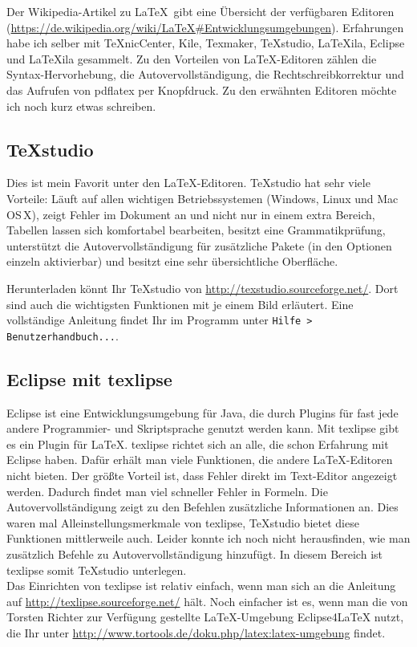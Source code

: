 Der Wikipedia-Artikel zu \LaTeX\ gibt eine Übersicht der verfügbaren Editoren (\url{https://de.wikipedia.org/wiki/LaTeX#Entwicklungsumgebungen}). Erfahrungen habe ich selber mit TeXnicCenter, Kile, Texmaker, TeXstudio, LaTeXila, Eclipse und LaTeXila gesammelt. Zu den Vorteilen von \LaTeX-Editoren zählen die Syntax-Hervorhebung, die Autovervollständigung, die Rechtschreibkorrektur und das Aufrufen von pdflatex per Knopfdruck. Zu den erwähnten Editoren möchte ich noch kurz etwas schreiben.

\subsection{TeXstudio}

Dies ist mein Favorit unter den \LaTeX-Editoren. TeXstudio hat sehr viele Vorteile: Läuft auf allen wichtigen Betriebssystemen (Windows, Linux und Mac\,OS\,X), zeigt Fehler im Dokument an und nicht nur in einem extra Bereich, Tabellen lassen sich komfortabel bearbeiten, besitzt eine Grammatikprüfung, unterstützt die Autovervollständigung für zusätzliche Pakete (in den Optionen einzeln aktivierbar) und besitzt eine sehr übersichtliche Oberfläche.

Herunterladen könnt Ihr TeXstudio von \url{http://texstudio.sourceforge.net/}. Dort sind auch die wichtigsten Funktionen mit je einem Bild erläutert. Eine vollständige Anleitung findet Ihr im Programm unter \verb|Hilfe > Benutzerhandbuch...|.

\subsection{Eclipse mit texlipse}

Eclipse ist eine Entwicklungsumgebung für Java, die durch Plugins für fast jede andere Programmier- und Skriptsprache genutzt werden kann. Mit texlipse gibt es ein Plugin für \LaTeX. texlipse richtet sich an alle, die schon Erfahrung mit Eclipse haben. Dafür erhält man viele Funktionen, die andere \LaTeX-Editoren nicht bieten. Der größte Vorteil ist, dass Fehler direkt im Text-Editor angezeigt werden. Dadurch findet man viel schneller Fehler in Formeln. Die Autovervollständigung zeigt zu den Befehlen zusätzliche Informationen an. Dies waren mal Alleinstellungsmerkmale von texlipse, TeXstudio bietet diese Funktionen mittlerweile auch. Leider konnte ich noch nicht herausfinden, wie man zusätzlich Befehle zu Autovervollständigung hinzufügt. In diesem Bereich ist texlipse somit TeXstudio unterlegen.\\
Das Einrichten von texlipse ist relativ einfach, wenn man sich an die Anleitung auf \url{http://texlipse.sourceforge.net/} hält. Noch einfacher ist es, wenn man die von Torsten Richter zur Verfügung gestellte \LaTeX-Umgebung Eclipse4LaTeX nutzt, die Ihr unter \url{http://www.tortools.de/doku.php/latex:latex-umgebung} findet.

